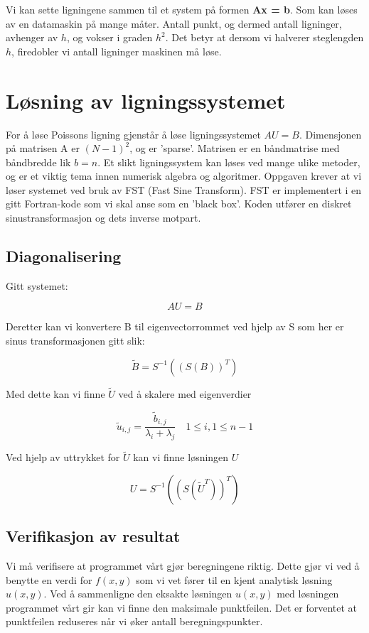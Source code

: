 \documentclass[11pt,norsk,a4paper]{article}
\begin{document}
Vi kan sette ligningene sammen til et system på formen \textbf{Ax = b}. Som kan løses av en datamaskin på mange måter. Antall punkt, og dermed antall ligninger, avhenger av $h$, og vokser i graden $h^2$. Det betyr at dersom vi halverer steglengden $h$, firedobler vi antall ligninger maskinen må løse.

\section{Løsning av ligningssystemet}

For å løse Poissons ligning gjenstår å løse ligningssystemet $AU=B$. Dimensjonen på matrisen A er $(N-1)^2$, og er 'sparse'. Matrisen er en båndmatrise med båndbredde lik $b=n$. Et slikt ligningssystem kan løses ved mange ulike metoder, og er et viktig tema innen numerisk algebra og algoritmer. Oppgaven krever at vi løser systemet ved bruk av FST (Fast Sine Transform). FST er implementert i en gitt Fortran-kode som vi skal anse som en 'black box'. Koden utfører en diskret sinustransformasjon og dets inverse motpart.

\subsection{Diagonalisering}

Gitt systemet:

$$ AU=B $$

Deretter kan vi konvertere B til eigenvectorrommet ved hjelp av S som her er sinus transformasjonen gitt slik:

$$ \widetilde{B} = S^{-1}((S(B))^T) $$

Med dette kan vi finne $\widetilde{U}$ ved å skalere med eigenverdier

$$ \widetilde{u}_{i,j} = \frac{\widetilde{b}_{i,j}}{\lambda_{i}+\lambda_{j}} \quad 1 \leq i,1 \leq n-1 $$

Ved hjelp av uttrykket for $\widetilde{U}$ kan vi finne løsningen $U$

$$ U = S^{-1}((S(\widetilde{U}^T))^T) $$

\subsection{Verifikasjon av resultat}

Vi må verifisere at programmet vårt gjør beregningene riktig. Dette gjør vi ved å benytte en verdi for $f(x,y)$ som vi vet fører til en kjent analytisk løsning $u(x,y)$. Ved å sammenligne den eksakte løsningen $u(x,y)$ med løsningen programmet vårt gir kan vi finne den maksimale punktfeilen. Det er forventet at punktfeilen reduseres når vi øker antall beregningspunkter.
\end{document}
